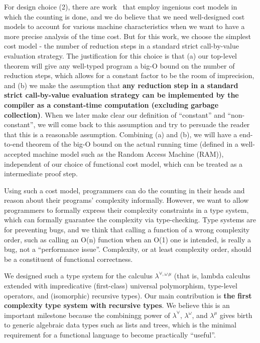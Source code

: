 \documentclass[preprint]{sigplanconf}
\begin{document}
For design choice (2), there are work~\cite{blelloch2013cache} that employ ingenious cost models in which the counting is done, and we do believe that we need well-designed cost models to account for various machine characteristics when we want to have a more precise analysis of the time cost. But for this work, we choose the simplest cost model - the number of reduction steps in a standard strict call-by-value evaluation strategy. The justification for this choice is that (a) our top-level theorem will give any well-typed program a big-O bound on the number of reduction steps, which allows for a constant factor to be the room of imprecision, and (b) we make the assumption that {\bf any reduction step in a standard strict call-by-value evaluation strategy can be implemented by the compiler as a constant-time computation (excluding garbage collection)}. When we later make clear our definition of ``constant'' and ``non-constant'', we will come back to this assumption and try to persuade the reader that this is a reasonable assumption. Combining (a) and (b), we will have a end-to-end theorem of the big-O bound on the actual running time (defined in a well-accepted machine model such as the Random Access Machine (RAM)), independent of our choice of functional cost model, which can be treated as a intermediate proof step.

Using such a cost model, programmers can do the counting in their heads and reason about their programs' complexity informally. However, we want to allow programmers to formally express their complexity constraints in a type system, which can formally guarantee the complexity via type-checking. Type systems are for preventing bugs, and we think that calling a function of a wrong complexity order, such as calling an O(n) function when an O(1) one is intended, is really a bug, not a ``performance issue''. Complexity, or at least complexity order, should be a constituent of functional correctness.

We designed such a type system for the calculus $\lambda^{\forall,\omega\,\mu}$ (that is, lambda calculus extended with impredicative (first-class) universal polymorphism, type-level operators, and (isomorphic) recursive types). Our main contribution is {\bf the first complexity type system with recursive types}. We believe this is an important milestone because the combiningg power of $\lambda^\forall$, $\lambda^\omega$, and $\lambda^\mu$ gives birth to generic algebraic data types such as lists and trees, which is the minimal requirement for a functional language to become practically ``useful''.
\end{document}
